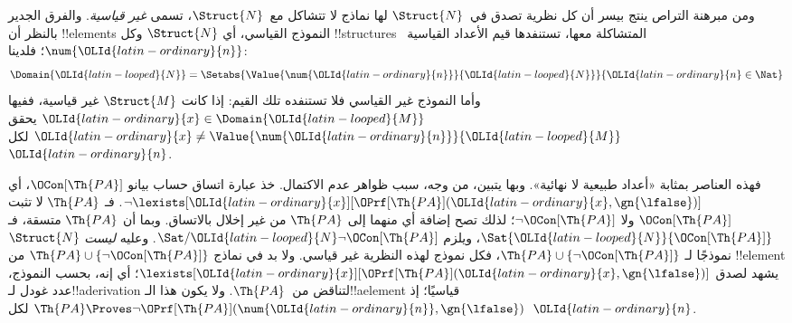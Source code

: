 \documentclass[../../../include/open-logic-section]{subfiles}
\begin{document}
ومن مبرهنة التراص ينتج بيسر أن كل نظرية تصدق في~$\Struct{N}$
لها نماذج لا تتشاكل مع~$\Struct{N}$، تسمى \emph{غير قياسية}.
والفرق الجدير بالنظر أن !!{element}s النموذج القياسي، أي
$\Struct{N}$ وكل !!{structure}s المتشاكلة معها، تستنفدها قيم
الأعداد القياسية~$\num{\OLId{latin-ordinary}{n}}$؛ فلدينا:
\[
\Domain{\OLId{latin-looped}{N}} = \Setabs{\Value{\num{\OLId{latin-ordinary}{n}}}{\OLId{latin-looped}{N}}}{\OLId{latin-ordinary}{n} \in \Nat}
\]
وأما النموذج غير القياسي فلا تستنفده تلك القيم: إذا كانت
$\Struct{M}$ غير قياسية، ففيها $\OLId{latin-ordinary}{x} \in \Domain{\OLId{latin-looped}{M}}$ يحقق
$\OLId{latin-ordinary}{x} \neq \Value{\num{\OLId{latin-ordinary}{n}}}{\OLId{latin-looped}{M}}$ لكل~$\OLId{latin-ordinary}{n}$.

فهذه العناصر بمثابة «أعداد طبيعية لا نهائية». وبها يتبين،
من وجه، سبب ظواهر عدم الاكتمال. خذ عبارة اتساق حساب بيانو
$\OCon[\Th{PA}]$، أي
$\lnot \lexists[\OLId{latin-ordinary}{x}][\OPrf[\Th{PA}](\OLId{latin-ordinary}{x}, \gn{\lfalse})]$.
فـ $\Th{PA}$ لا تثبت $\OCon[\Th{PA}]$ ولا $\lnot \OCon[\Th{PA}]$؛
لذلك تصح إضافة أي منهما إلى $\Th{PA}$ من غير إخلال بالاتساق.
وبما أن $\Th{PA}$ متسقة، فـ $\Sat{\OLId{latin-looped}{N}}{\OCon[\Th{PA}]}$،
ويلزم $\Sat/{\OLId{latin-looped}{N}}{\lnot \OCon[\Th{PA}]}$. وعليه \emph{ليست}
$\Struct{N}$ نموذجًا لـ $\Th{PA} \cup \{\lnot \OCon[\Th{PA}]\}$،
فكل نموذج لهذه النظرية غير قياسي. ولا بد في نماذج
$\Th{PA} \cup \{\lnot \OCon[\Th{PA}]\}$ من !!{element} يشهد
لصدق $\lexists[\OLId{latin-ordinary}{x}][\OPrf[\Th{PA}](\OLId{latin-ordinary}{x},\gn{\lfalse})]$؛ أي إنه،
بحسب النموذج، عدد غودل لـ!!a{derivation} لتناقض من~$\Th{PA}$.
ولا يكون هذا الـ!!a{element} قياسيًا؛ إذ
$\Th{PA} \Proves \lnot \OPrf[\Th{PA}](\num{\OLId{latin-ordinary}{n}}, \gn{\lfalse})$
لكل~$\OLId{latin-ordinary}{n}$.
\end{document}
